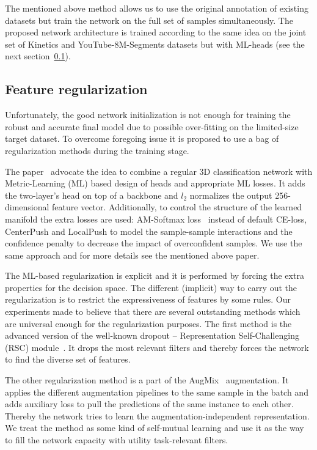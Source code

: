 \documentclass[twoside, twocolumn]{article}
\begin{document}
The mentioned above method allows us to use the original annotation of existing datasets but train the network on the
full set of samples simultaneously. The proposed network architecture is trained according to the same idea on the joint
set of Kinetics and YouTube-8M-Segments datasets but with ML-heads (see the next section~\ref{feature-regularzation}).

\subsection{Feature regularization} \label{feature-regularzation}

\lettrine[nindent=0em,lines=3]{U}{}nfortunately, the good network initialization is not enough for training the robust
and accurate final model due to possible over-fitting on the limited-size target dataset. To overcome foregoing issue it
is proposed to use a bag of regularization methods during the training stage.

The paper~\cite{ASLNet} advocate the idea to combine a regular 3D classification network with Metric-Learning (ML)
based design of heads and appropriate ML losses. It adds the two-layer's head on top of a backbone and $l_2$
normalizes the output 256-dimensional feature vector. Additionally, to control the structure of the learned manifold the
extra losses are used: AM-Softmax loss~\cite{AM-Softmax} instead of default CE-loss, CenterPush and LocalPush to model
the sample-sample interactions and the confidence penalty to decrease the impact of overconfident samples. We use the
same approach and for more details see the mentioned above paper.

The ML-based regularization is explicit and it is performed by forcing the extra properties for the decision space. The
different (implicit) way to carry out the regularization is to restrict the expressiveness of features by some rules.
Our experiments made to believe that there are several outstanding methods which are universal enough for the
regularization purposes. The first method is the advanced version of the well-known dropout -- Representation
Self-Challenging (RSC) module~\cite{RSC}. It drops the most relevant filters and thereby forces the network to find the
diverse set of features.

The other regularization method is a part of the AugMix~\cite{AugMix} augmentation. It applies the different
augmentation pipelines to the same sample in the batch and adds auxiliary loss to pull the predictions of the same
instance to each other. Thereby the network tries to learn the augmentation-independent representation. We treat the
method as some kind of self-mutual learning \cite{SFR} and use it as the way to fill the network capacity with utility
task-relevant filters.
\end{document}
